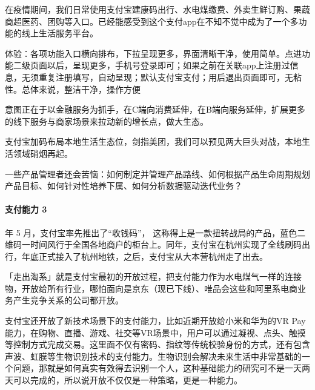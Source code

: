 \documentclass[letterpaper,11pt,english]{sphinxmanual}
\begin{document}
在疫情期间，我们日常使用支付宝建康码出行、水电煤缴费、外卖生鲜订购、果蔬商超医药、团购等入口。已经能感受到这个支付app在不知不觉中成为了一个多功能的线上生活服务平台。

体验：各项功能入口横向排布，下拉呈现更多，界面清晰干净，使用简单。点进功能二级页面以后，呈现更多，手机号登录即可；如果之前在关联app上注册过信息，无须重复注册填写，自动呈现；默认支付宝支付；用后退出页面即可，无粘性。总体来说，整洁干净，操作方便
%
\begin{footnote}[878]\sphinxAtStartFootnote
{}
%
\end{footnote}

意图正在于以金融服务为抓手，在C端向消费延伸，在B端向服务延伸，扩展更多的线下服务与商家场景来拉动新的增长点，做大生态。

支付宝加码布局本地生活生态位，剑指美团，我们可以预见两大巨头对战，本地生活领域硝烟再起。

一些产品管理者还会苦恼：如何制定并管理产品路线、如何根据产品生命周期规划产品目标、如何针对性培养下属、如何分析数据驱动迭代业务？


\paragraph{支付能力 3\sphinxfootnotemark[879]}
\label{\detokenize{chapter_company/alipay:id8}}%
\begin{footnotetext}[879]\sphinxAtStartFootnote
{}
%
\end{footnotetext} 年 5 月，支付宝率先推出了“收钱码”，
这称得上是一款扭转战局的产品，蓝色二维码一时间风行于全国各地商户的柜台上。同年，支付宝在杭州实现了全线刷码出行，年底正式接入了杭州地铁，之后，支付宝从大本营杭州走了出去。%
\begin{footnote}[880]\sphinxAtStartFootnote
{}
%
\end{footnote}

「走出淘系」就是支付宝最初的开放过程，把支付能力作为水电煤气一样的连接物，开放给所有行业，哪怕面向是京东（现已下线）、唯品会这些和阿里系电商业务产生竞争关系的公司都开放。

支付宝还开放了新技术场景下的支付能力，比如近期开放给小米和华为的VR
Pay能力，在购物、直播、游戏、社交等VR场景中，用户可以通过凝视、点头、触摸等控制方式完成交易。这里面不仅有密码、指纹等传统校验身份的方式，还有包含声波、虹膜等生物识别技术的支付能力。生物识别会解决未来生活中非常基础的一个问题，那就是如何真实有效得去识别一个人，这种基础能力的研究可不是一天两天可以完成的，所以说开放不仅仅是一种策略，更是一种能力。
\end{document}
